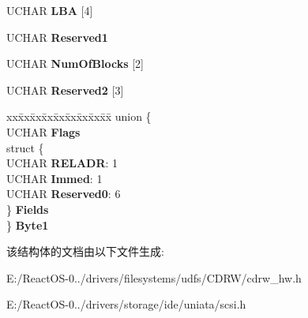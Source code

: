 \begin{DoxyCompactItemize}
\begin{tabbing}
\end{tabbing}\item 
\mbox{\label{struct___c_d_b_1_1___s_y_n_c_h_r_o_n_i_z_e___c_a_c_h_e_a78646a2113e006747f45b06056b833f7}} 
U\+C\+H\+AR {\bfseries L\+BA} \mbox{[}4\mbox{]}
\item 
\mbox{\label{struct___c_d_b_1_1___s_y_n_c_h_r_o_n_i_z_e___c_a_c_h_e_a2b7333837c24fcd8410b106ebaf369d8}} 
U\+C\+H\+AR {\bfseries Reserved1}
\item 
\mbox{\label{struct___c_d_b_1_1___s_y_n_c_h_r_o_n_i_z_e___c_a_c_h_e_ad056fd4c4c1b1c58939aac287b91ed6c}} 
U\+C\+H\+AR {\bfseries Num\+Of\+Blocks} \mbox{[}2\mbox{]}
\item 
\mbox{\label{struct___c_d_b_1_1___s_y_n_c_h_r_o_n_i_z_e___c_a_c_h_e_a0d248cfbc1f3ed6f81b6e4cbc9ef0706}} 
U\+C\+H\+AR {\bfseries Reserved2} \mbox{[}3\mbox{]}
\item 
\mbox{\label{struct___c_d_b_1_1___s_y_n_c_h_r_o_n_i_z_e___c_a_c_h_e_a614a4850119b69b0509f4b904c48f94e}} 
\begin{tabbing}
xx\=xx\=xx\=xx\=xx\=xx\=xx\=xx\=xx\=\kill
union \{\\
\>UCHAR {\bfseries Flags}\\
\>struct \{\\
\>\>UCHAR {\bfseries RELADR}: 1\\
\>\>UCHAR {\bfseries Immed}: 1\\
\>\>UCHAR {\bfseries Reserved0}: 6\\
\>\} {\bfseries Fields}\\
\} {\bfseries Byte1}\\

\end{tabbing}\end{DoxyCompactItemize}


该结构体的文档由以下文件生成\+:\begin{DoxyCompactItemize}
\item 
E\+:/\+React\+O\+S-\/0../drivers/filesystems/udfs/\+C\+D\+R\+W/cdrw\+\_\+hw.\+h\item 
E\+:/\+React\+O\+S-\/0../drivers/storage/ide/uniata/scsi.\+h\end{DoxyCompactItemize}
